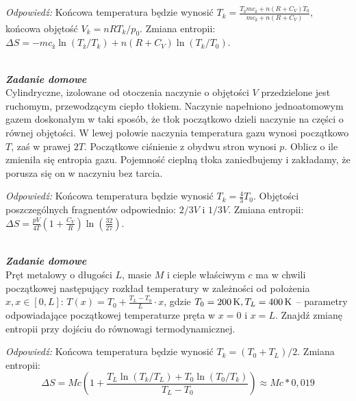 \documentclass[11pt,a4paper]{article}
\renewcommand{\t}[1]{\textrm{#1}}
\newcounter{zaddom}\newcommand{\zaddom}[1][]{\addtocounter{zaddom}{1} ~\\  {\bf \emph{Zadanie domowe \arabic{zaddom} #1 }} \\}
\renewcommand{\t}[1]{\textrm{#1}}
\begin{document}
\noindent
\emph{Odpowiedź:} Końcowa temperatura będzie wynosić $T_k = \frac{T_{\t{ż}} m  c_{\t{ż}} + n (R + C_V)T_0}{m c_{\t{ż}}+ n(R + C_V)}$,
końcowa objętość $V_k = n R T_k/p_0$. Zmiana entropii: $\Delta S=-m c_{\t{ż}} \ln(T_{\t{ż}}/T_k) + n(R + C_V) \ln(T_k/T_0)$.

\zaddom
Cylindryczne, izolowane od otoczenia naczynie o objętości $V$ przedzielone jest ruchomym,
przewodzącym ciepło tłokiem. Naczynie napełniono jednoatomowym gazem doskonałym w
taki sposób, że tłok początkowo dzieli naczynie na części o równej objętości. W lewej
połowie naczynia temperatura gazu wynosi początkowo $T$, zaś w prawej $2T$. Początkowe
ciśnienie z obydwu stron wynosi $p$.
Oblicz o ile zmieniła się entropia gazu.
Pojemność cieplną tłoka zaniedbujemy i zakładamy, że porusza się on w naczyniu bez tarcia.
\newline

\noindent
\emph{Odpowiedź:} Końcowa temperatura będzie wynosić $T_k = \frac{4}{3} T_0$. Objętości poszczególnych fragnentów odpowiednio: $2/3 V$ i $1/3 V$. Zmiana entropii: $\Delta S=\frac{p V}{4 T} \left(1 + \frac{C_V}{R}  \right)\ln\left(\frac{32}{27}\right)$.

\newpage

\zaddom
Pręt metalowy o długości $L$, masie $M$ i cieple właściwym $c$ ma w chwili początkowej
następujący rozkład temperatury w zależności od położenia $x, x\in[0,L]$:
$T(x)=T_0+ \frac{T_L-T_0}{L} \cdot x$, gdzie $T_0=200\,{\rm K}, T_L=400\,{\rm K}$ -- parametry
odpowiadające początkowej temperaturze pręta w $x=0$ i $x=L$.
Znajdź zmianę entropii przy dojściu do równowagi termodynamicznej.
\newline

\noindent
\emph{Odpowiedź:} Końcowa temperatura będzie wynosić $T_k = (T_0+T_L)/2$. 
Zmiana entropii: $$\Delta S = M c \left(1  + \frac{T_L \ln(T_k/T_L) + T_0 \ln(T_0/T_k)}{T_L - T_0}   \right)  \approx M c * 0,019$$
\end{document}
